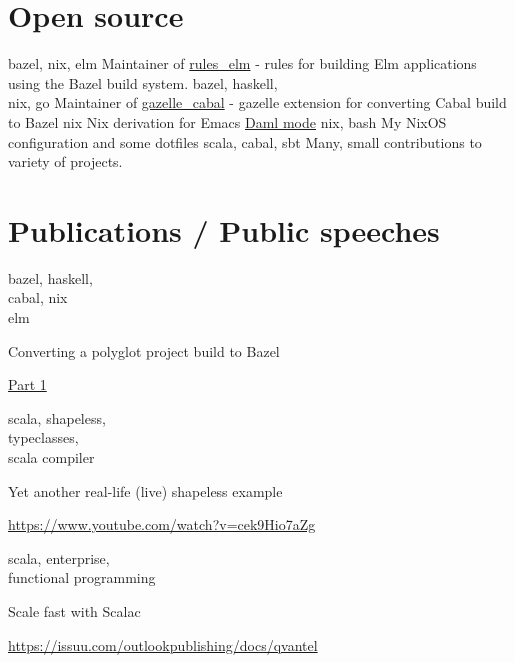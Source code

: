 \documentclass[a4paper,11pt]{cv4tw}%
\begin{document}
\section{Open source}
      {bazel, nix, elm}
      {Maintainer of \href{https://github.com/kczulko/rules\_elm}{rules\_elm} - rules for building Elm applications using the Bazel build system.
      }
      {bazel, haskell,\\nix, go}
      {Maintainer of \href{https://github.com/tweag/gazelle\_cabal}{gazelle\_cabal} - gazelle extension for converting Cabal build to Bazel
      }
      {nix}
      {Nix derivation for Emacs \href{https://github.com/digital-asset/daml}{Daml mode}
      }
      {nix, bash}
      {My NixOS configuration and some dotfiles
      }
      {scala, cabal, sbt}
      {Many, small contributions to variety of projects.
      }

\section{Publications / Public speeches}
      {bazel, haskell,\\cabal, nix\\elm}
      {Converting a polyglot project build to Bazel
        \begin{missions}
          \item \href{https://www.tweag.io/blog/2022-10-20-bazel-example-servant-elm-1/}{Part 1}
        \end{missions}
      }
      {scala, shapeless,\\typeclasses,\\scala compiler}
      {Yet another real-life (live) shapeless example
        \begin{missions}
          \item \href{https://www.youtube.com/watch?v=cek9Hio7aZg}{https://www.youtube.com/watch?v=cek9Hio7aZg}
        \end{missions}
      }
      {scala, enterprise,\\functional programming}
      {Scale fast with Scalac
        \begin{missions}
          \item \href{https://issuu.com/outlookpublishing/docs/qvantel}{https://issuu.com/outlookpublishing/docs/qvantel}
        \end{missions}
      }
\end{document}
